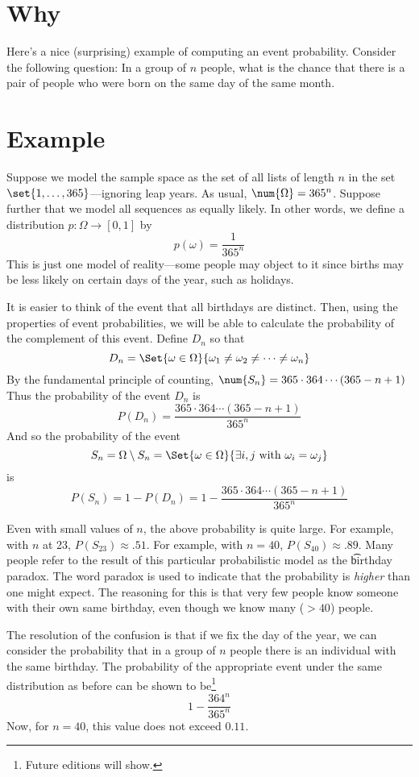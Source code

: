 
\section*{Why}

Here's a nice (surprising) example of computing an event probability.
Consider the following question:
In a group of $n$ people, what is the chance that there is a pair of people who were born on the same day of the same month.

\section*{Example}

Suppose we model the sample space as the set of all lists of length $n$ in the set $\set{1, \dots , 365}$---ignoring leap years.
As usual, $\num{\Omega } = 365^n$.
Suppose further that we model all sequences as equally likely.
In other words, we define a distribution $p: \Omega  \to [0,1]$ by
\[
p(\omega ) = \frac{1}{365^n}
\]
This is just one model of reality---some people may object to it since births may be less likely on certain days of the year, such as holidays.

It is easier to think of the event that all birthdays are distinct.
Then, using the properties of event probabilities, we will be able to calculate the probability of the complement of this event.
Define $D_n$ so that
\[
D_n = \Set{\omega  \in \Omega }{\omega _1 \neq \omega _2 \neq \cdots \neq \omega _n}
\]
By the fundamental principle of counting, $\num{S_n} = 365\cdot 364\cdots(365-n+1)$
Thus the probability of the event $D_n$ is
\[
P(D_n) = \frac{365\cdot 364\cdots(365-n+1)}{365^n}
\]
And so the probability of the event
\[
S_n = \Omega  \setminus S_n = \Set{\omega  \in \Omega }{\exists i,j \text{ with } \omega _i = \omega _j}
\]
is
\[
P(S_n) = 1 - P(D_n) = 1 - \frac{365\cdot 364\cdots(365-n+1)}{365^n}
\]

Even with small values of $n$, the above probability is quite large.
For example, with $n$ at 23, $P(S_{23}) \approx .51$.
For example, with $n = 40$, $P(S_{40}) \approx .89$.
Many people refer to the result of this particular probabilistic model as the \t{birthday paradox}.
The word paradox is used to indicate that the probability is \textit{higher} than one might expect.
The reasoning for this is that very few people know someone with their own same birthday, even though we know many ($>40$) people.

The resolution of the confusion is that if we fix the day of the year, we can consider the probability that in a group of $n$ people there is an individual with the same birthday.
The probability of the appropriate event under the same distribution as before can be shown to be\footnote{Future editions will show.}
\[
1 - \frac{364^n}{365^n}
\]
Now, for $n = 40$, this value does not exceed $0.11$.

\blankpage